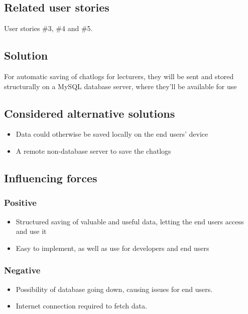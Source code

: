\documentclass[12pt, a4paper]{article}
\begin{document}
\subsection{Related user stories}
User stories \#3, \#4 and \#5.
\subsection{Solution}
For automatic saving of chatlogs for lecturers, they will be sent and stored structurally on a MySQL database server, where they'll be available for use
\subsection{Considered alternative solutions}
\begin{itemize}
    \item Data could otherwise be saved locally on the end users' device
    \item A remote non-database server to save the chatlogs
\end{itemize}
\subsection{Influencing forces}
\begin{minipage}[t]{0.5\textwidth}
    \subsubsection*{Positive}
    \begin{itemize}
        \item Structured saving of valuable and useful data, letting the end users access and use it
        \item Easy to implement, as well as use for developers and end users
    \end{itemize}
\end{minipage}%
\begin{minipage}[t]{0.5\textwidth}
    \subsubsection*{Negative}
    \begin{itemize}
        \item Possibility of database going down, causing issues for end users.
        \item Internet connection required to fetch data.
    \end{itemize}
\end{minipage}
\end{document}
